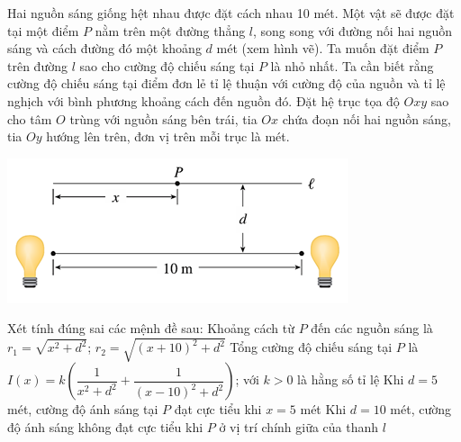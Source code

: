  \begin{ex}%
     Hai nguồn sáng giống hệt nhau được đặt cách nhau 10 mét. Một vật sẽ được đặt tại một điểm $P$ nằm trên một đường thẳng $l$, song song với đường nối hai nguồn sáng và cách đường đó một khoảng $d$ mét (xem hình vẽ).
     Ta muốn đặt điểm $P$ trên đường $l$ sao cho cường độ chiếu sáng tại $P$ là nhỏ nhất. Ta cần biết rằng cường độ chiếu sáng tại điểm đơn lẻ tỉ lệ thuận với cường độ của nguồn và tỉ lệ nghịch với bình phương khoảng cách đến nguồn đó.
     Đặt hệ trục tọa độ $Oxy$ sao cho tâm $O$ trùng với nguồn sáng bên trái, tia $Ox$ chứa đoạn nối hai nguồn sáng, tia $Oy$ hướng lên trên, đơn vị trên mỗi trục là mét.
     \begin{center}
         \includegraphics[scale=1]{img/HXN-6.14}
     \end{center}
     Xét tính đúng sai các mệnh đề sau:
     \choiceTF
     {Khoảng cách từ $P$ đến các nguồn sáng là $r_1 = \sqrt{x^2 + d^2}$; $r_2 = \sqrt{(x+10)^2 + d^2}$}
     {\True Tổng cường độ chiếu sáng tại $P$ là $I(x) = k\left( \dfrac{1}{x^2+d^2} + \dfrac{1}{(x-10)^2+d^2} \right)$; với $k > 0$ là hằng số tỉ lệ}
     {\True Khi $d=5$ mét, cường độ ánh sáng tại $P$ đạt cực tiểu khi $x=5$ mét}
     {\True Khi $d=10$ mét, cường độ ánh sáng không đạt cực tiểu khi $P$ ở vị trí chính giữa của thanh $l$}
\end{ex}

